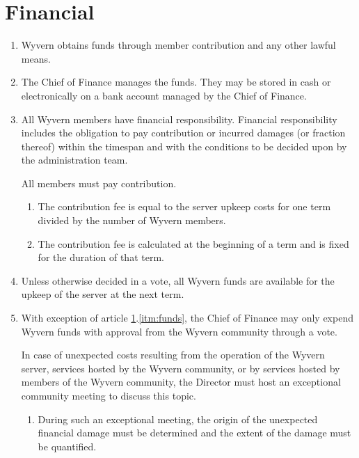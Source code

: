 \section{Financial}
\label{sec:financial}

\begin{enumerate}
    \item Wyvern obtains funds through member contribution and any other lawful means.

    \item The Chief of Finance manages the funds. They may be stored in cash or electronically on a bank account managed by the Chief of Finance.

    \item All Wyvern members have financial responsibility. Financial responsibility includes the obligation to pay contribution or incurred damages (or fraction thereof) within the timespan and with the conditions to be decided upon by the administration team.

    \begin{item}
        All members must pay contribution.
        \begin{enumerate}
            \item The contribution fee is equal to the server upkeep costs for one term divided by the number of Wyvern members.
            \item The contribution fee is calculated at the beginning of a term and is fixed for the duration of that term.
        \end{enumerate}
    \end{item}

    \item \label{itm:funds} Unless otherwise decided in a vote, all Wyvern funds are available for the upkeep of the server at the next term.

    \item With exception of article \ref{sec:financial}.\ref{itm:funds}, the Chief of Finance may only expend Wyvern funds with approval from the Wyvern community through a vote.

    \begin{item}
         In case of unexpected costs resulting from the operation of the Wyvern server, services hosted by the Wyvern community, or by services hosted by members of the Wyvern community, the Director must host an exceptional community meeting to discuss this topic.
        
        \begin{enumerate}
            \item During such an exceptional meeting, the origin of the unexpected financial damage must be determined and the extent of the damage must be quantified.


\end{enumerate}
\end{item}
\end{enumerate}
